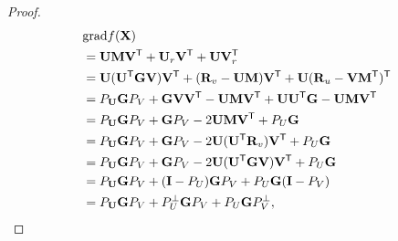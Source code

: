 \documentclass[10pt,twocolumn,letterpaper]{article}
\def\symp{r}
\def\bR{{\bf R}}
\def\U{{\bf U}}
\def\V{{\bf V}}
\def\trsp{{\sf T}}
\def\G{{\bf G}}
\def\grad{{\text{grad}}}
\def\bM{{\bf M}}
\def\bI{{\bf I}}
\def\bX{{\bf X}}
\def\bI{{\bf I}}
\def\bX{{\bf X}}
\begin{document}
\begin{proof}
\begin{align}
\label{eq:proof_lemma1}
       & \grad f(\bX) \\
       & = \U \bM \V^{\trsp} + \U_{\symp} \V^{\trsp} + \U \V_{\symp}^{\trsp}  \nonumber \\
       & = \U(\U^{\trsp} \G \V) \V^{\trsp} + (\bR_{v} - \U \bM) \V^{\trsp} + \U (\bR_{u} - \V \bM^{\trsp})^{\trsp} \nonumber \\
       & = P_{\U} \G P_{V} + \G \V \V^{\trsp} - \U \bM \V^{\trsp} + \U \U^{\trsp} \G - \U \bM \V^{\trsp} \nonumber \\
       & = P_{\U} \G P_{V} + \G P_{V} - 2\U \bM \V^{\trsp} + P_{U} \G  \nonumber \\
       & = P_{\U} \G P_{V} + \G P_{V} - 2\U (\U^{\trsp} \bR_{v}) \V^{\trsp} + P_{U} \G  \nonumber \\
       & = P_{\U} \G P_{V} + \G P_{V} - 2\U (\U^{\trsp} \G \V) \V^{\trsp} + P_{U} \G  \nonumber \\
       & = P_{\U} \G P_{V} + (\bI - P_{U}) \G P_{V} + P_{U} \G (\bI - P_{V})  \nonumber \\
       & = P_{\U} \G P_{V} + P_{U}^{\perp} \G P_{V} + P_{U} \G P_{V}^{\perp}  ,
\end{align}
\end{proof}
\end{document}
